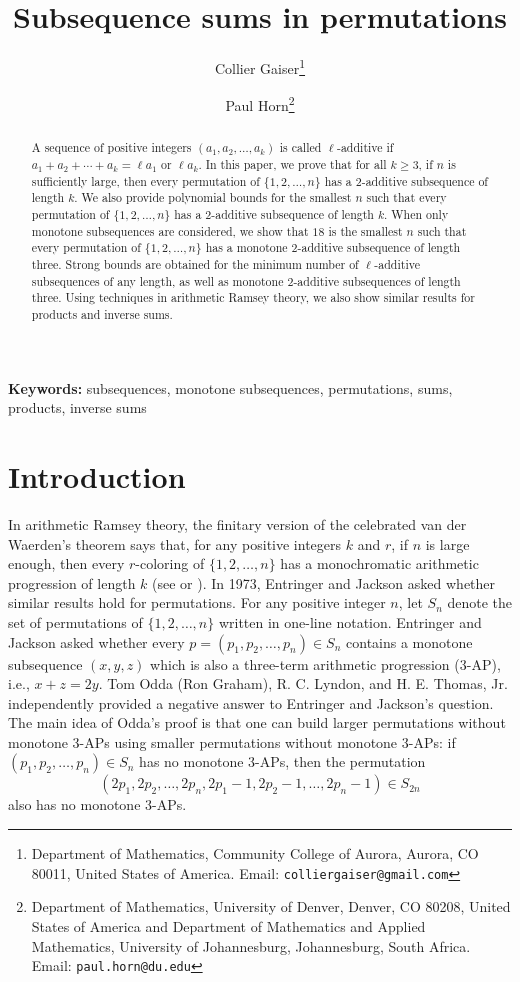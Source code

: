 \documentclass[11pt]{article}
\title{Subsequence sums in permutations}
\author{ Collier Gaiser\thanks{Department of Mathematics, Community College of Aurora, Aurora, CO 80011,  United States of America. Email: {\tt colliergaiser@gmail.com}}
\and  Paul Horn\thanks{Department of Mathematics, University of Denver, Denver, CO 80208,  United States of America and Department of Mathematics and Applied Mathematics, University of Johannesburg, Johannesburg, South Africa. Email: {\tt paul.horn@du.edu}} 
}
\date{}
\theoremstyle{definition}
\begin{document}
\maketitle


\maketitle
\begin{abstract}
A sequence of positive integers $(a_1,a_2,\ldots,a_k)$ is called $\ell$-additive if $a_1+a_2+\cdots+a_k=\ell a_1$ or $\ell a_k$. In this paper, we prove that for all $k\geq3$, if $n$ is sufficiently large, then every permutation of $\{1,2,\ldots,n\}$ has a 2-additive subsequence of length $k$. We also provide polynomial bounds for the smallest $n$ such that every permutation of $\{1,2,\ldots,n\}$ has a 2-additive subsequence of length $k$. When only monotone subsequences are considered, we show that $18$ is the smallest $n$ such that every permutation of $\{1,2,\ldots,n\}$ has a monotone 2-additive subsequence of length three. Strong bounds are obtained for the minimum number of $\ell$-additive subsequences of any length, as well as monotone $2$-additive subsequences of length three. Using techniques in arithmetic Ramsey theory, we also show similar results for products and inverse sums. 
\end{abstract}

{\small \textbf{Keywords:} subsequences, monotone subsequences, permutations, sums, products, inverse sums} \\

\maketitle

\section{Introduction}
In arithmetic Ramsey theory, the finitary version of the celebrated van der Waerden's theorem says that, for any positive integers $k$ and $r$, if $n$ is large enough, then every $r$-coloring of $\{1,2,\ldots,n\}$ has a monochromatic arithmetic progression of length $k$ (see \cite[Chapter 3]{GrahamButler2015} or \cite[Chapter 2]{LandmanRobertson2014}). In 1973, Entringer and Jackson \cite{EntringerJackson1973} asked whether similar results hold for permutations. For any positive integer $n$, let $S_n$ denote the set of permutations of $\{1,2,\ldots,n\}$ written in one-line notation. Entringer and Jackson asked whether every $p=(p_1,p_2,\ldots,p_n)\in S_n$ contains a monotone subsequence $(x,y,z)$ which is also a three-term arithmetic progression (3-AP), i.e., $x+z=2y$. Tom Odda (Ron Graham), R. C. Lyndon, and H. E. Thomas, Jr. \cite{EOLT1975} independently provided a negative answer to Entringer and Jackson's question. The main idea of Odda's proof is that one can build larger permutations without monotone 3-APs using smaller permutations without monotone 3-APs: if $(p_1,p_2,\ldots,p_n)\in S_n$ has no monotone 3-APs, then the permutation \[(2p_1,2p_2,\ldots,2p_n,2p_1-1,2p_2-1,\ldots,2p_n-1)\in S_{2n}\] also has no monotone 3-APs.
\end{document}
